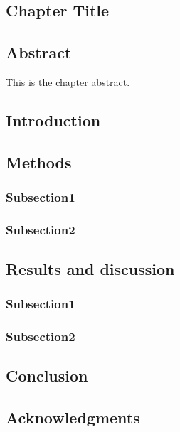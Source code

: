\chapter{}
\section*{Chapter Title}
\label{ch:2}


\newpage
\section*{Abstract}

This is the chapter abstract.

\newpage
\section{Introduction}

\newpage
\section{Methods}
\subsection{Subsection1}
\subsection{Subsection2}

\newpage
\section{Results and discussion}
\subsection{Subsection1}
\subsection{Subsection2}

\newpage
\section{Conclusion}


\section*{Acknowledgments}
